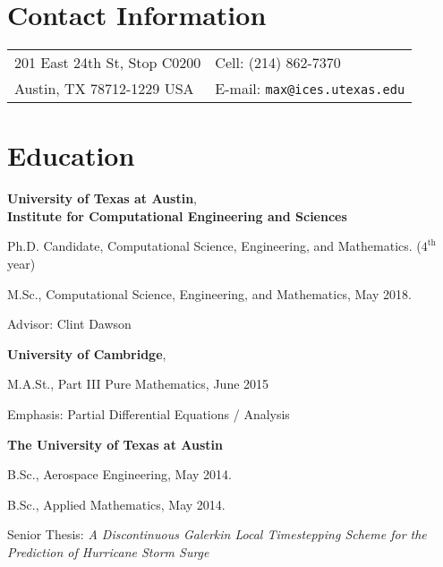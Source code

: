 \documentclass[margin,line]{res}
\newenvironment{list1}{
  \begin{list}{\ding{113}}{%
      \setlength{\itemsep}{0in}
      \setlength{\parsep}{0in} \setlength{\parskip}{0in}
      \setlength{\topsep}{0in} \setlength{\partopsep}{0in}
      \setlength{\leftmargin}{0.17in}}}{\end{list}}
\begin{document}
 

\begin{resume}

\section{\sc Contact Information} 
\begin{tabular}{@{}p{3.25in}p{4in}}
201 East 24th St, Stop C0200 & { Cell:} (214) 862-7370 \\
Austin, TX 78712-1229 USA & {E-mail:} {\tt max@ices.utexas.edu}
\end{tabular} 


\section{\sc Education} 

\textbf{University of Texas at Austin}, \\
\textbf{Institute for Computational Engineering and Sciences} \\ 
\vspace*{-.1in} 

\begin{list1} 
\item[] Ph.D. Candidate, Computational Science, Engineering, and Mathematics.
  ($4^{\text{th}}$ year) 
\item[] M.Sc., Computational Science, Engineering, and Mathematics, May 2018.
\item[] Advisor: Clint Dawson
\end{list1} 

\textbf{University of Cambridge}, \\
\vspace*{-.1in} 

\begin{list1} 
\item[] M.A.St., Part III Pure Mathematics, June 2015
\item[] Emphasis: Partial Differential Equations / Analysis
\end{list1} 

\textbf{The University of Texas at Austin} \\

\vspace*{-.1in}
\begin{list1}
\item[] B.Sc., Aerospace Engineering, May 2014.
\item[] B.Sc., Applied Mathematics, May 2014. 
\item[] Senior Thesis: \textit{A Discontinuous Galerkin Local Timestepping Scheme for the Prediction of Hurricane Storm Surge}
\end{list1} 



\end{resume}
\end{document}
